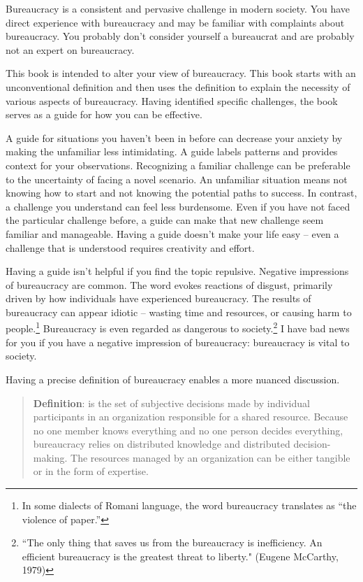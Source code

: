 

Bureaucracy is a consistent and pervasive challenge in modern society. You have direct experience with bureaucracy and may be familiar with complaints about bureaucracy. You probably don't consider yourself a bureaucrat and are probably not an expert on bureaucracy.

This book is intended to alter your view of bureaucracy. This book starts with an unconventional definition and then uses the definition to explain the necessity of various aspects of bureaucracy. Having identified specific challenges, the book serves as a guide for how you can be effective. 

A guide for situations you haven't been in before can decrease your anxiety by making the unfamiliar less intimidating. 
A guide labels patterns and provides context for your observations. 
Recognizing a familiar challenge can be preferable to the uncertainty of facing a novel scenario. An unfamiliar situation means not knowing how to start and not knowing the potential paths to success. In contrast, a challenge you understand can feel less burdensome. 
Even if you have not faced the particular challenge before, a guide can make that new challenge seem familiar and manageable. 
Having a guide doesn't make your life easy -- even a challenge that is understood requires creativity and effort.


Having a guide isn't helpful if you find the topic repulsive.
Negative impressions of bureaucracy are common. The word
evokes reactions of disgust, primarily driven by how individuals have experienced bureaucracy.
The results of bureaucracy can appear idiotic -- 
wasting time and resources, or causing harm to people.\footnote{In some dialects of Romani language, the word bureaucracy translates as ``the violence of paper.''}
Bureaucracy is even regarded as dangerous to society.\footnote{``The only thing that saves us from the bureaucracy is inefficiency. An efficient bureaucracy is the greatest threat to liberty." (Eugene McCarthy, 1979)}
I have bad news for you if you have a negative impression of bureaucracy: bureaucracy is vital to society. 

Having a precise definition of bureaucracy enables a more nuanced discussion. 
\begin{quote}
\textbf{Definition}: 
\iftoggle{glossarysubstitutionworks}{\Gls{bureaucracy}}{Bureaucracy}
is the set of subjective decisions made by individual participants in an organization responsible for a shared resource. Because no one member knows everything and no one person decides everything, bureaucracy relies on distributed knowledge and distributed decision-making.
The resources managed by an organization can be either tangible or in the form of expertise.  
\end{quote}

